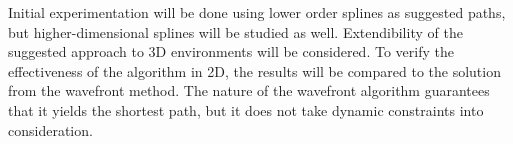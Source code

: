 Initial experimentation will be done using lower order splines as suggested paths, but higher-dimensional splines will be studied as well. Extendibility of the suggested approach to 3D environments will be considered. To verify the effectiveness of the algorithm in 2D, the results will be compared to the solution from the wavefront method. The nature of the wavefront algorithm guarantees that it yields the shortest path, but it does not take dynamic constraints into consideration.